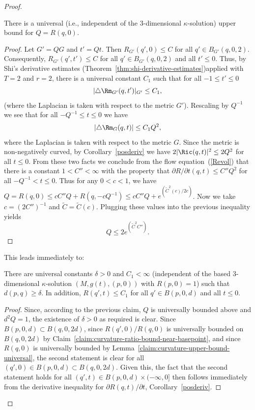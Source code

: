 \begin{proof}
\begin{claim}\label{claim:curvature-upper-bound-universal}
\label{zkbound}
There is a universal (i.e., independent of the $3$-dimensional
$\kappa$-solution) upper bound  for $Q=R(q,0)$.
\end{claim}



\begin{proof}
Let $G'=QG$ and $t'=Qt$. Then $R_{G'}(q',0)\le C$ for all $q'\in
B_{G'}(q,0,2)$. Consequently, $R_{G'}(q',t')\le C$ for all $q'\in
B_{G'}(q,0,2)$ and all $t'\le 0$.  Thus, by Shi's derivative
estimates (Theorem~\ref{thm:shi-derivative-estimates})applied  with $T=2$ and $r=2$, there is
a universal constant $C_1$ such that for all $-1\le t'\le 0$
$$|\triangle \Rm_{G'}(q,t')|_{G'}\le C_1,$$
(where the Laplacian is taken with respect to the metric $G'$).
Rescaling by $Q^{-1}$ we see that for all $-Q^{-1}\le t\le 0$ we
have
$$|\triangle \Rm_{G}(q,t)|\le C_1Q^2,$$
where the Laplacian is taken with respect to the metric $G$. Since
the metric is non-negatively curved, by Corollary~\ref{posderiv} we
have  $2|\Ric(q,t)|^2\le 2Q^2$ for all $t\le 0$.
 From these two facts we conclude from
the flow equation~(\ref{Revol}) that there is a constant $1<C''<\infty$ with
the property that $\partial R/\partial t(q,t)\le C''Q^2$ for all $-Q^{-1}<t\le
0$.
 Thus for any $0<c<1$, we have $Q=R(q,0)\le
cC''Q+R(q,-cQ^{-1})\le cC''Q+e^{(\widetilde C^2(c)/2c)}$. Now we
take $c=(2C'')^{-1}$ and $\widetilde C=\widetilde C(c)$. Plugging
these values into the previous inequality yields
$$Q\le 2e^{(\tilde C^2C'')}.$$
\end{proof}


This leads immediately to:

\begin{claim}\label{claim:basepoint-neighborhood-curvature-bound}
\label{bdnearxk}
There are universal constants $\delta>0$ and  $C_1<\infty$
(independent of the based $3$-dimensional $\kappa$-solution
$(M,g(t),(p,0))$ with $R(p,0)=1$) such that $d(p,q)\ge \delta$. In
addition,  $R(q',t)\le C_1$ for all $q'\in B(p,0,d)$ and all $t\le
0$.
\end{claim}


\begin{proof}
Since, according to the previous claim, $Q$ is universally bounded
above and $d^2Q=1$, the existence of $\delta>0$ as required is
clear. Since $B(p,0,d)\subset B(q,0,2d)$, since $R(q',0)/R(q,0)$ is
universally bounded on $B(q,0,2d)$ by Claim~\ref{claim:curvature-ratio-bound-near-basepoint}, and since
$R(q,0)$ is universally bounded by Lemma~\ref{claim:curvature-upper-bound-universal}, the second
statement is clear for all $(q',0)\in B(p,0,d)\subset B(q,0,2d)$.
Given this, the fact that the second statement holds for all
$(q',t)\in B(p,0,d)\times(-\infty,0]$ then follows immediately from
the derivative inequality for $\partial R(q,t)/\partial t$,
Corollary~\ref{posderiv}.
\end{proof}


\end{proof}
